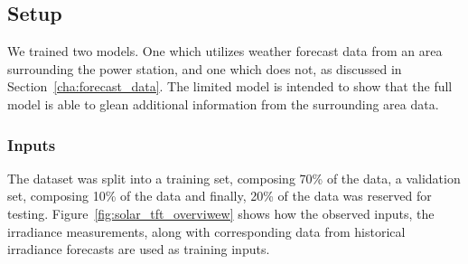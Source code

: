     \subsection{Setup}
    We trained two models. One which utilizes weather forecast data from an area surrounding the power station, and one which does not, as discussed in Section~\ref{cha:forecast_data}. The limited model is intended to show that the full model is able to glean additional information from the surrounding area data.
    
    


    \subsubsection{Inputs}
        The dataset was split into a training set, composing 70\% of the data, a validation set, composing 10\% of the data and finally, 20\% of the data was reserved for testing.
        Figure~\ref{fig:solar_tft_overviwew} shows how the observed inputs, the irradiance measurements, along with corresponding data from historical irradiance forecasts are used as training inputs.
        

